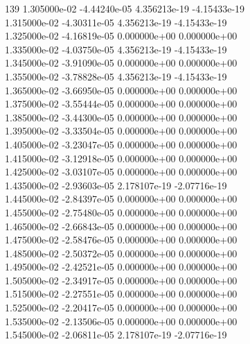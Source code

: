 139	1.305000e-02	-4.44240e-05	4.356213e-19	-4.15433e-19	\\ 	1.315000e-02	-4.30311e-05	4.356213e-19	-4.15433e-19	\\ 	1.325000e-02	-4.16819e-05	0.000000e+00	0.000000e+00	\\ 	1.335000e-02	-4.03750e-05	4.356213e-19	-4.15433e-19	\\ 	1.345000e-02	-3.91090e-05	0.000000e+00	0.000000e+00	\\ 	1.355000e-02	-3.78828e-05	4.356213e-19	-4.15433e-19	\\ 	1.365000e-02	-3.66950e-05	0.000000e+00	0.000000e+00	\\ 	1.375000e-02	-3.55444e-05	0.000000e+00	0.000000e+00	\\ 	1.385000e-02	-3.44300e-05	0.000000e+00	0.000000e+00	\\ 	1.395000e-02	-3.33504e-05	0.000000e+00	0.000000e+00	\\ 	1.405000e-02	-3.23047e-05	0.000000e+00	0.000000e+00	\\ 	1.415000e-02	-3.12918e-05	0.000000e+00	0.000000e+00	\\ 	1.425000e-02	-3.03107e-05	0.000000e+00	0.000000e+00	\\ 	1.435000e-02	-2.93603e-05	2.178107e-19	-2.07716e-19	\\ 	1.445000e-02	-2.84397e-05	0.000000e+00	0.000000e+00	\\ 	1.455000e-02	-2.75480e-05	0.000000e+00	0.000000e+00	\\ 	1.465000e-02	-2.66843e-05	0.000000e+00	0.000000e+00	\\ 	1.475000e-02	-2.58476e-05	0.000000e+00	0.000000e+00	\\ 	1.485000e-02	-2.50372e-05	0.000000e+00	0.000000e+00	\\ 	1.495000e-02	-2.42521e-05	0.000000e+00	0.000000e+00	\\ 	1.505000e-02	-2.34917e-05	0.000000e+00	0.000000e+00	\\ 	1.515000e-02	-2.27551e-05	0.000000e+00	0.000000e+00	\\ 	1.525000e-02	-2.20417e-05	0.000000e+00	0.000000e+00	\\ 	1.535000e-02	-2.13506e-05	0.000000e+00	0.000000e+00	\\ 	1.545000e-02	-2.06811e-05	2.178107e-19	-2.07716e-19	\\ \hline

